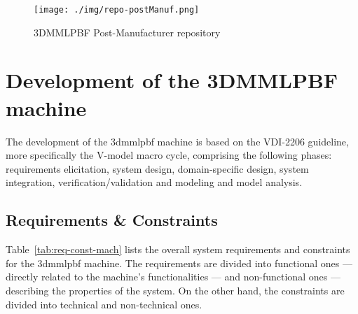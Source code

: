 \begin{figure}[!hbt]
  \centering
    \texttt{[image: ./img/repo-postManuf.png]}
    \caption{3DMMLPBF Post-Manufacturer repository~\cite{repoPostmanuf}}%
    \label{fig:repoPostmanuf}
\end{figure}



\section{Development of the 3DMMLPBF machine}
The development of the \gls{3dmmlpbf} machine is based on the VDI-2206 guideline, more specifically the V-model macro cycle,
comprising the following phases: requirements elicitation, system design,
domain-specific design, system integration, verification/validation and modeling
and model analysis.
% 
% 
% 
% 
% 

\subsection{Requirements \& Constraints}

Table~\ref{tab:req-const-mach} lists the overall system requirements and
constraints for the \gls{3dmmlpbf} machine.
The requirements are divided into functional ones --- directly related to the
machine's functionalities --- and non-functional ones --- describing the
properties of the system. On the other hand, the constraints are divided into
technical and non-technical ones.

